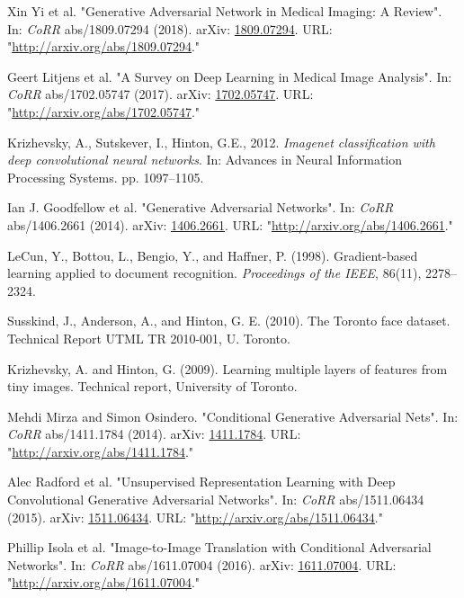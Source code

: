\begin{thebibliography}{100}

Xin Yi et al. "{Generative Adversarial Network in Medical Imaging: A Review}".
In: \textit{CoRR} abs/1809.07294
(2018). arXiv: \href{http://arxiv.org/abs/1809.07294}{1809.07294}. URL: "\url{http://arxiv.org/abs/1809.07294}."

Geert Litjens et al. "{A Survey on Deep Learning in Medical Image Analysis}".
In: \textit{CoRR} abs/1702.05747
(2017). arXiv: \href{http://arxiv.org/abs/1702.05747}{1702.05747}. URL: "\url{http://arxiv.org/abs/1702.05747}."

Krizhevsky, A., Sutskever, I., Hinton,  G.E., 2012. \textit{Imagenet classification with deep convolutional neural networks}. In: Advances in Neural Information Processing Systems. pp. 1097–1105.



Ian J. Goodfellow et al. "{Generative Adversarial Networks}".
In: \textit{CoRR} abs/1406.2661
(2014). arXiv: \href{http://arxiv.org/abs/1406.2661}{1406.2661}. URL: "\url{http://arxiv.org/abs/1406.2661}."

LeCun, Y., Bottou, L., Bengio, Y., and Haffner, P. (1998). Gradient-based learning applied to document recognition. \textit{Proceedings of the IEEE}, 86(11), 2278–2324.

Susskind, J., Anderson, A., and Hinton, G. E. (2010). The Toronto face dataset. Technical Report UTML TR 2010-001, U. Toronto.

Krizhevsky, A. and Hinton, G. (2009). Learning multiple layers of features from tiny images. Technical report, University of Toronto.

Mehdi Mirza and Simon Osindero. "{Conditional Generative Adversarial Nets}".
In: \textit{CoRR} abs/1411.1784
(2014). arXiv: \href{http://arxiv.org/abs/1411.1784}{1411.1784}. URL: "\url{http://arxiv.org/abs/1411.1784}."

Alec Radford et al. "{Unsupervised Representation Learning with Deep Convolutional Generative Adversarial Networks}".
In: \textit{CoRR} abs/1511.06434
(2015). arXiv: \href{http://arxiv.org/abs/1511.06434}{1511.06434}. URL: "\url{http://arxiv.org/abs/1511.06434}."

Phillip Isola et al. "{Image-to-Image Translation with Conditional Adversarial Networks}".
In: \textit{CoRR} abs/1611.07004
(2016). arXiv: \href{http://arxiv.org/abs/1611.07004}{1611.07004}. URL: "\url{http://arxiv.org/abs/1611.07004}."


\end{thebibliography}
